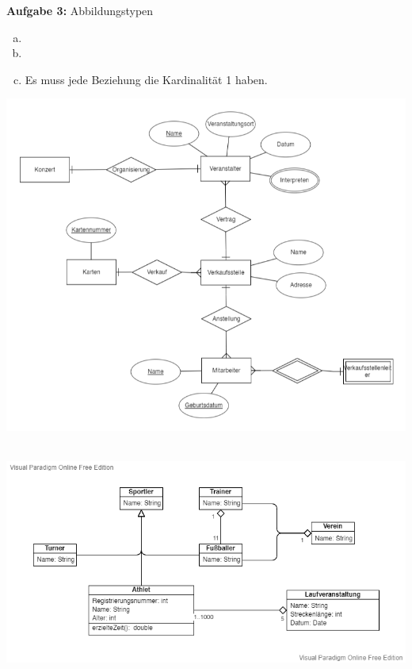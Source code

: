 \documentclass[a4paper,12pt]{article}
\newcommand{\Aufgabe}[1]{
        {
        \vspace*{0.5cm}
        \textbf{Aufgabe #1}
        \vspace*{0.2cm}
    }
}
\begin{document}
    \Aufgabe{3:}Abbildungstypen \\
    \begin{enumerate}[(a)]
        \item
        \item
        \item Es muss jede Beziehung die Kardinalität 1 haben.
    \end{enumerate}

    \includegraphics[width=\linewidth]{DBS-UEB02-A4.png}
    \caption{\Aufgabe{4:}ER-Modell Erstellung} \\

    \includegraphics[width=\textwidth]{DBS-UEB02-A5.png}
    \caption{\Aufgabe{5:}UML}

\end{document}
